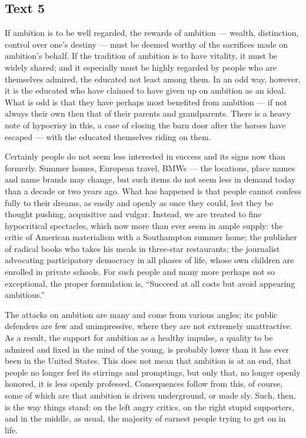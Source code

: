 \documentclass[UTF8,11pt]{ctexart}
\begin{document}
\subsection*{\textbf{Text 5}}


If ambition is to be well regarded, the rewards of ambition — wealth, distinction, control over one’s destiny — must be deemed worthy of the sacrifices made on ambition’s behalf. If the tradition of ambition is to have vitality, it must be widely shared; and it especially must be highly regarded by people who are themselves admired, the educated not least among them. In an odd way, however, it is the educated who have claimed to have given up on ambition as an ideal. What is odd is that they have perhaps most benefited from ambition — if not always their own then that of their parents and grandparents. There is a heavy note of hypocrisy in this, a case of closing the barn door after the horses have escaped — with the educated themselves riding on them.


Certainly people do not seem less interested in success and its signs now than formerly. Summer homes, European travel, BMWs — the locations, place names and name brands may change, but such items do not seem less in demand today than a decade or two years ago. What has happened is that people cannot confess fully to their dreams, as easily and openly as once they could, lest they be thought pushing, acquisitive and vulgar. Instead, we are treated to fine hypocritical spectacles, which now more than ever seem in ample supply: the critic of American materialism with a Southampton summer home; the publisher of radical books who takes his meals in three-star restaurants; the journalist advocating participatory democracy in all phases of life, whose own children are enrolled in private schools. For such people and many more perhaps not so exceptional, the proper formulation is, “Succeed at all costs but avoid appearing ambitious.”


The attacks on ambition are many and come from various angles; its public defenders are few and unimpressive, where they are not extremely unattractive. As a result, the support for ambition as a healthy impulse, a quality to be admired and fixed in the mind of the young, is probably lower than it has ever been in the United States. This does not mean that ambition is at an end, that people no longer feel its stirrings and promptings, but only that, no longer openly honored, it is less openly professed. Consequences follow from this, of course, some of which are that ambition is driven underground, or made sly. Such, then, is the way things stand: on the left angry critics, on the right stupid supporters, and in the middle, as usual, the majority of earnest people trying to get on in life.
\end{document}
